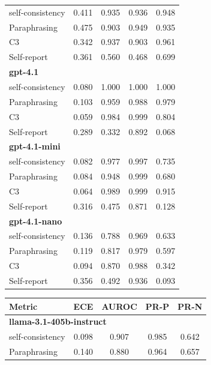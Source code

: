 \documentclass[11pt]{article}
\theoremstyle{plain}
\theoremstyle{definition}
\theoremstyle{remark}
\begin{document}
\begin{table}[p]
\begin{minipage}[t]{0.48\textwidth}
\begin{tabular}{lcccc}
        self-consistency & 0.411 & 0.935 & 0.936 & 0.948 \\
        Paraphrasing     & 0.475 & 0.903 & 0.949 & 0.935 \\
       C3             & 0.342 & 0.937 & 0.903 & 0.961 \\
        Self-report      & 0.361 & 0.560 & 0.468 & 0.699 \\
        \midrule
        \multicolumn{5}{l}{\textbf{gpt-4.1}} \\
        self-consistency & 0.080 & 1.000 & 1.000 & 1.000 \\
        Paraphrasing     & 0.103 & 0.959 & 0.988 & 0.979 \\
       C3             & 0.059 & 0.984 & 0.999 & 0.804 \\
        Self-report      & 0.289 & 0.332 & 0.892 & 0.068 \\
        \midrule
        \multicolumn{5}{l}{\textbf{gpt-4.1-mini}} \\
        self-consistency & 0.082 & 0.977 & 0.997 & 0.735 \\
        Paraphrasing     & 0.084 & 0.948 & 0.999 & 0.680 \\
       C3             & 0.064 & 0.989 & 0.999 & 0.915 \\
        Self-report      & 0.316 & 0.475 & 0.871 & 0.128 \\
        \midrule
        \multicolumn{5}{l}{\textbf{gpt-4.1-nano}} \\
        self-consistency & 0.136 & 0.788 & 0.969 & 0.633 \\
        Paraphrasing     & 0.119 & 0.817 & 0.979 & 0.597 \\
       C3             & 0.094 & 0.870 & 0.988 & 0.342 \\
        Self-report      & 0.356 & 0.492 & 0.936 & 0.093 \\
        \bottomrule
    \end{tabular}
\end{minipage}
\hfill
\begin{minipage}[t]{0.48\textwidth}
    \centering
    \begin{tabular}{lcccc}
        \toprule
        \textbf{Metric} & \textbf{ECE} & \textbf{AUROC} & \textbf{PR-P} & \textbf{PR-N} \\
        \midrule
        \multicolumn{5}{l}{\textbf{llama-3.1-405b-instruct}} \\
        self-consistency & 0.098 & 0.907 & 0.985 & 0.642 \\
        Paraphrasing     & 0.140 & 0.880 & 0.964 & 0.657 \\

\end{tabular}
\end{minipage}
\end{table}
\end{document}
